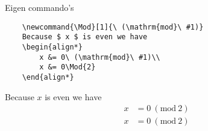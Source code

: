 \copyrightTim
\copyrightVincent

\begin{frame}[fragile]{Eigen commando's}
    \begin{verbatim}
    \newcommand{\Mod}[1]{\ (\mathrm{mod}\ #1)}
    Because $ x $ is even we have
    \begin{align*}
        x &= 0\ (\mathrm{mod}\ #1)\\
        x &= 0\Mod{2}
    \end{align*}
\end{verbatim}
\bgroup
\def\Mod#1{\ (\mathrm{mod}\ #1)}
    Because $ x $ is even we have
    \begin{align*}
        x &= 0\ (\mathrm{mod}\ 2)\\
        x &= 0\Mod{2}
    \end{align*}

\egroup
\end{frame}